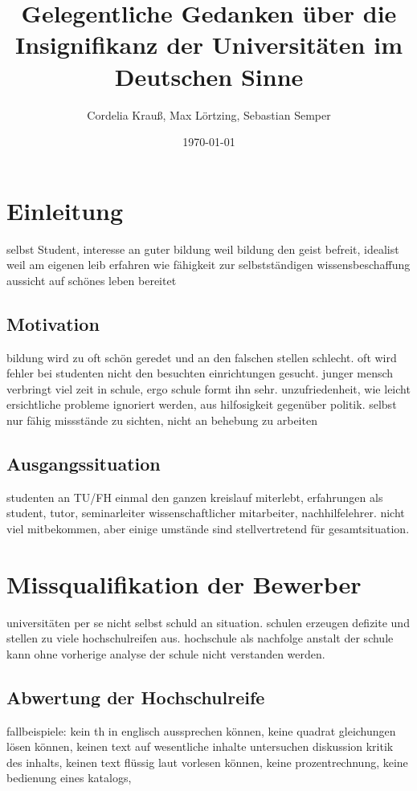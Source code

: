 \documentclass[a4paper,10pt,twoside,titlepage]{article}
\author{Cordelia Krauß, Max Lörtzing, Sebastian Semper}
\title{Gelegentliche Gedanken über die Insignifikanz der Universitäten im Deutschen Sinne}
\date{\today}
\begin{document}
\maketitle

\tableofcontents

\newpage


\section{Einleitung}
selbst Student, interesse an guter bildung weil bildung den geist befreit, idealist weil am eigenen leib erfahren wie fähigkeit zur selbstständigen wissensbeschaffung aussicht auf schönes leben bereitet

\subsection{Motivation}
bildung wird zu oft schön geredet und an den falschen stellen schlecht. oft wird fehler bei studenten nicht den besuchten einrichtungen gesucht. junger mensch verbringt viel zeit in schule, ergo schule formt ihn sehr. unzufriedenheit, wie leicht ersichtliche probleme ignoriert werden, aus hilfosigkeit gegenüber politik. selbst nur fähig missstände zu sichten, nicht an behebung zu arbeiten

\subsection{Ausgangssituation}
studenten an TU/FH einmal den ganzen kreislauf miterlebt, erfahrungen als student, tutor, seminarleiter wissenschaftlicher mitarbeiter, nachhilfelehrer. nicht viel mitbekommen, aber einige umstände sind stellvertretend für gesamtsituation.

\section{Missqualifikation der Bewerber}
universitäten per se nicht selbst schuld an situation. schulen erzeugen defizite und stellen zu viele hochschulreifen aus. hochschule als nachfolge anstalt der schule kann ohne vorherige analyse der schule nicht verstanden werden.

\subsection{Abwertung der Hochschulreife}
fallbeispiele: kein th in englisch aussprechen können, keine quadrat gleichungen lösen können, keinen text auf wesentliche inhalte untersuchen diskussion kritik des inhalts, keinen text flüssig laut vorlesen können, keine prozentrechnung, keine bedienung eines katalogs,
\end{document}
